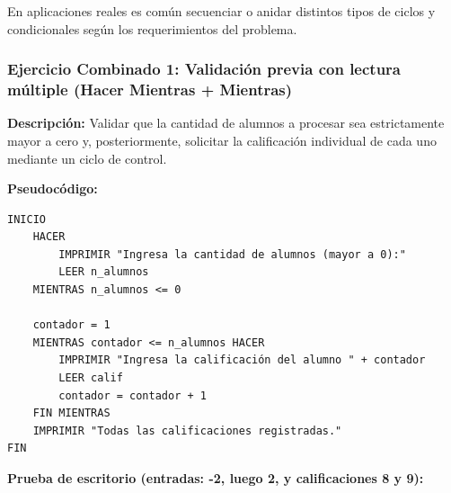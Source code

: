 En aplicaciones reales es común secuenciar o anidar distintos tipos de
ciclos y condicionales según los requerimientos del problema.

\subsubsection{Ejercicio Combinado 1: Validación previa con lectura
múltiple (Hacer Mientras +
Mientras)}\label{ejercicio-combinado-1-validaciuxf3n-previa-con-lectura-muxfaltiple-hacer-mientras-mientras}

\textbf{Descripción:} Validar que la cantidad de alumnos a procesar sea
estrictamente mayor a cero y, posteriormente, solicitar la calificación
individual de cada uno mediante un ciclo de control.

\textbf{Pseudocódigo:}

\begin{verbatim}
INICIO
    HACER
        IMPRIMIR "Ingresa la cantidad de alumnos (mayor a 0):"
        LEER n_alumnos
    MIENTRAS n_alumnos <= 0
    
    contador = 1
    MIENTRAS contador <= n_alumnos HACER
        IMPRIMIR "Ingresa la calificación del alumno " + contador
        LEER calif
        contador = contador + 1
    FIN MIENTRAS
    IMPRIMIR "Todas las calificaciones registradas."
FIN
\end{verbatim}

\textbf{Prueba de escritorio (entradas: -2, luego 2, y calificaciones 8
y 9):}


